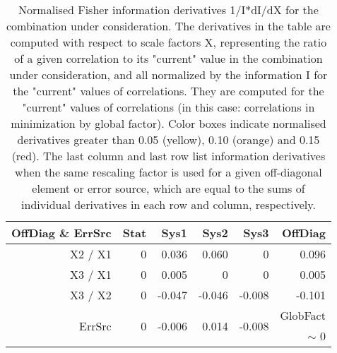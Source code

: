 \begin{table}[H]
\scriptsize
\begin{center}
\renewcommand{\arraystretch}{1.1}
\begin{tabular}{|r|rrrr|r|}
\hline
 OffDiag \& ErrSrc & {\tiny Stat} & {\tiny Sys1} & {\tiny Sys2} & {\tiny Sys3} & OffDiag\\
\hline
X2 / X1 &  0 &      0.036 &  \colorbox{Yellow1}{    0.060} &  0 &  \colorbox{Yellow1}{    0.096} \\
X3 / X1 &  0 &      0.005 &  0 &  0 &      0.005 \\
X3 / X2 &  0 &     -0.047 &     -0.046 &     -0.008 &     -0.101 \\
\hline
\multirow{2}{*}{ErrSrc} & \multirow{2}{*}{ 0} & \multirow{2}{*}{    -0.006} & \multirow{2}{*}{     0.014} & \multirow{2}{*}{    -0.008} & GlobFact\\
 & & & & &  {\tiny $\sim$ }0 \\
\hline
\end{tabular}
\renewcommand{\arraystretch}{1}
\caption{Normalised Fisher information derivatives 1/I*dI/dX for the combination under consideration. The derivatives in the table are computed with respect to scale factors X, representing the ratio of a given correlation to its "current" value in the combination under consideration, and all normalized by the information I for the "current" values of correlations. They are computed for the "current" values of correlations (in this case: correlations in minimization by global factor). Color boxes indicate normalised derivatives greater than 0.05 (yellow), 0.10 (orange) and 0.15 (red). The last column and last row list information derivatives when the same rescaling factor is used for a given off-diagonal element or error source, which are equal to the sums of individual derivatives in each row and column, respectively.}
\end{center}
\end{table}
